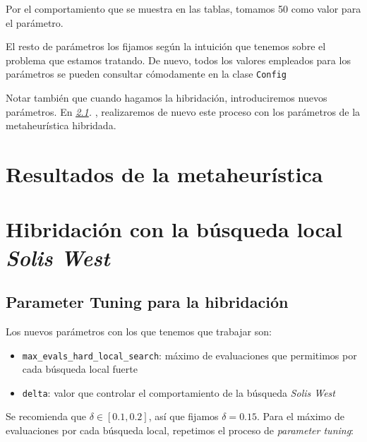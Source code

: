 \documentclass[11pt]{article}
\begin{document}
Por el comportamiento que se muestra en las tablas, tomamos 50 como valor para el parámetro.

El resto de parámetros los fijamos según la intuición que tenemos sobre el problema que estamos tratando. De nuevo, todos los valores empleados para los parámetros se pueden consultar cómodamente en la clase \lstinline{Config}

Notar también que cuando hagamos la hibridación, introduciremos nuevos parámetros. En \emph{\ref{tuning_hib}. }, realizaremos de nuevo este proceso con los parámetros de la metaheurística hibridada.

\pagebreak
\section{Resultados de la metaheurística}

\pagebreak
\section{Hibridación con la búsqueda local \emph{Solis West}}

\subsection{Parameter Tuning para la hibridación} \label{tuning_hib}

Los nuevos parámetros con los que tenemos que trabajar son:

\begin{itemize}
    \item \lstinline{max_evals_hard_local_search}: máximo de evaluaciones que permitimos por cada búsqueda local fuerte
    \item \lstinline{delta}: valor que controlar el comportamiento de la búsqueda \emph{Solis West}
\end{itemize}

Se recomienda que $\delta \in [0.1, 0.2]$, así que fijamos $\delta = 0.15$. Para el máximo de evaluaciones por cada búsqueda local, repetimos el proceso de \emph{parameter tuning}:

\begin{table}[H]
    \centering
    \caption{\emph{Parameter Tuning} para el máximo de evaluaciones por cada búsqueda local fuerte}
\end{table}
\end{document}
